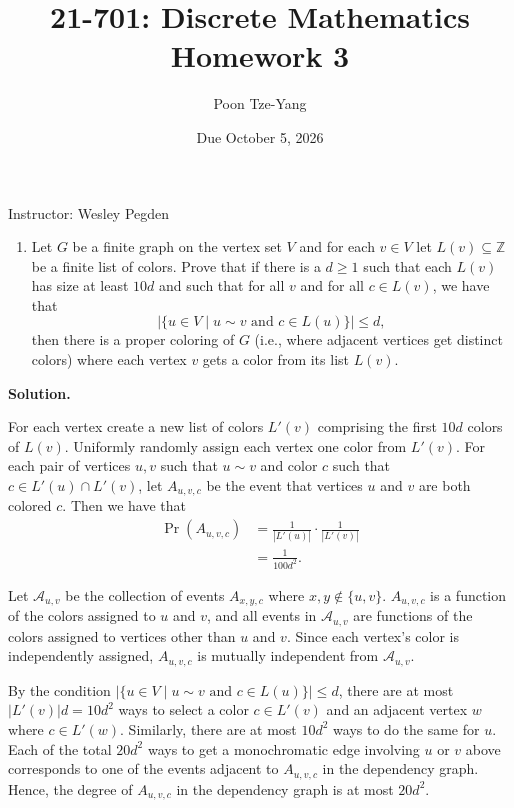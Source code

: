 \documentclass[11pt,letterpaper]{article}
\title{21-701: Discrete Mathematics \\ Homework 3}
\author{Poon Tze-Yang}
\date{Due October 5, 2026}
\theoremstyle{definition}
\newcommand{\calA}{\mathcal{A}}
\newcommand{\solution}{\medskip\noindent\textbf{Solution.}\par\medskip}
\begin{document}
\maketitle

\noindent Instructor: Wesley Pegden

\begin{enumerate}[series=q]
\item Let $G$ be a finite graph on the vertex set $V$ and for each $v\in V$ let $L(v)\subseteq\mathbb{Z}$ be a finite list of colors. Prove that if there is a $d\geq 1$ such that each $L(v)$ has size at least $10d$ and such that for all $v$ and for all $c\in L(v)$, we have that
\[
|\{u\in V \mid u\sim v \text{ and } c\in L(u)\}| \leq d,
\]
then there is a proper coloring of $G$ (i.e., where adjacent vertices get distinct colors) where each vertex $v$ gets a color from its list $L(v)$.
\end{enumerate}

\solution

For each vertex create a new list of colors $L'(v)$ comprising the first $10d$ colors of $L(v)$.
Uniformly randomly assign each vertex one color from $L'(v)$.
For each pair of vertices $u,v$ such that $u\sim v$ and color $c$ such that $c\in L'(u)\cap L'(v)$, let $A_{u,v,c}$ be the event that vertices $u$ and $v$ are both colored $c$.
Then we have that
\begin{align*}
    \Pr(A_{u,v,c}) &= \frac{1}{|L'(u)|}\cdot \frac{1}{|L'(v)|} \\
    &=\frac{1}{100d^2}.
\end{align*}

Let $\calA_{u,v}$ be the collection of events $A_{x,y,c}$ where $x,y\notin \{u,v\}$.
$A_{u,v,c}$ is a function of the colors assigned to $u$ and $v$, and all events in $\calA_{u,v}$ are functions of the colors assigned to vertices other than $u$ and $v$.
Since each vertex's color is independently assigned, $A_{u,v,c}$ is mutually independent from $\calA_{u,v}$.

By the condition $|\{u\in V \mid u\sim v \text{ and } c\in L(u)\}| \leq d$, there are at most $|L'(v)|d = 10d^2$ ways to select a color $c\in L'(v)$ and an adjacent vertex $w$ where $c\in L'(w)$. 
Similarly, there are at most $10d^2$ ways to do the same for $u$. 
Each of the total $20d^2$ ways to get a monochromatic edge involving $u$ or $v$ above corresponds to one of the events adjacent to $A_{u,v,c}$ in the dependency graph.
Hence, the degree of $A_{u,v,c}$ in the dependency graph is at most $20d^2$.
\end{document}
